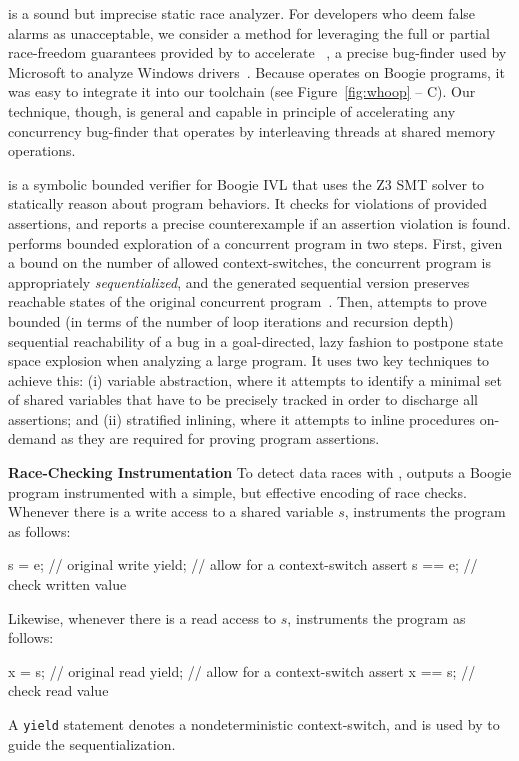 \whoop is a sound but imprecise static race analyzer. For developers who deem false alarms as unacceptable, we consider a method for leveraging the full or partial race-freedom guarantees provided by \whoop to accelerate \corral~\cite{lal2012corral}, a precise bug-finder used by Microsoft to analyze Windows drivers~\cite{lal2014powering}.  Because \corral operates on Boogie programs, it was easy to integrate it into our toolchain (see Figure~\ref{fig:whoop} -- C). Our technique, though, is general and capable in principle of accelerating any concurrency bug-finder that operates by interleaving threads at shared memory operations.

\corral is a symbolic bounded verifier for Boogie IVL that uses the Z3 SMT solver to statically reason about program behaviors. It checks for violations of provided assertions, and reports a precise counterexample if an assertion violation is found. \corral performs bounded exploration of a concurrent program in two steps. First, given a bound on the number of allowed context-switches, the concurrent program is appropriately \emph{sequentialized}, and the generated sequential version preserves reachable states of the original concurrent program~\cite{popl2011-eqr,cav2009-lqr,cavLalR08}. Then, \corral attempts to prove bounded (in terms of the number of loop iterations and recursion depth) sequential reachability of a bug in a goal-directed, lazy fashion to postpone state space explosion when analyzing a large program. It uses two key techniques to achieve this: (i) variable abstraction, where it attempts to identify a minimal set of shared variables that have to be precisely tracked in order to discharge all assertions; and (ii) stratified inlining, where it attempts to inline procedures on-demand as they are required for proving program assertions.

\noindent\textbf{Race-Checking Instrumentation }
%
To detect data races with \corral, \whoop outputs a Boogie program instrumented with a simple, but effective encoding of race checks. Whenever there is a write access to a shared variable $s$, \whoop instruments the program as follows:
%
\begin{boogie}
s = e;         // original write
yield;         // allow for a context-switch
assert s == e; // check written value
\end{boogie}\vspace{-2mm}
%
Likewise, whenever there is a read access to $s$, \whoop instruments the program as follows:
%
\begin{boogie}
x = s;         // original read
yield;         // allow for a context-switch
assert x == s; // check read value
\end{boogie}\vspace{-2mm}
%
A \texttt{yield} statement denotes a nondeterministic context-switch, and is used by \corral to guide the sequentialization.

